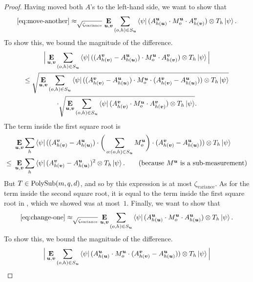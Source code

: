 \begin{proof}
Having moved both $A$'s to the left-hand side, we want to show that
\begin{equation}\label{eq:change-one}
\eqref{eq:move-another}
\approx_{\sqrt{\zeta_{\mathrm{variance}}}}
\mathop{\bf E\/}_{\boldsymbol{u}, \boldsymbol{v}} \sum_{(o, h) \in S_{\boldsymbol{u}}} \bra{\psi} (A^{\boldsymbol{u}}_{h(\boldsymbol{u})} \cdot M^{\boldsymbol{u}}_o \cdot A^{\boldsymbol{v}}_{h(\boldsymbol{v})}) \otimes T_h  \ket{\psi}.
\end{equation} 
To show this, we bound the magnitude of the difference.
\begin{multline}\label{eq:change-one-cauchy-schwarz}
\Big|\mathop{\bf E\/}_{\boldsymbol{u}, \boldsymbol{v}} \sum_{(o, h) \in S_{\boldsymbol{u}}} \bra{\psi} ((A^{\boldsymbol{v}}_{h(\boldsymbol{v})} - A^{\boldsymbol{u}}_{h(\boldsymbol{u})}) \cdot M^{\boldsymbol{u}}_o \cdot A^{\boldsymbol{v}}_{h(\boldsymbol{v})}) \otimes T_h  \ket{\psi}\Big|\\
\leq
\sqrt{\mathop{\bf E\/}_{\boldsymbol{u}, \boldsymbol{v}} \sum_{(o, h) \in S_{\boldsymbol{u}}} \bra{\psi} ((A^{\boldsymbol{v}}_{h(\boldsymbol{v})} - A^{\boldsymbol{u}}_{h(\boldsymbol{u})}) \cdot M^{\boldsymbol{u}}_o \cdot (A^{\boldsymbol{v}}_{h(\boldsymbol{v})} - A^{\boldsymbol{u}}_{h(\boldsymbol{u})})) \otimes T_h  \ket{\psi}}\\
\cdot \sqrt{\mathop{\bf E\/}_{\boldsymbol{u}, \boldsymbol{v}} \sum_{(o, h) \in S_{\boldsymbol{u}}} \bra{\psi} (A^{\boldsymbol{v}}_{h(\boldsymbol{v})} \cdot M^{\boldsymbol{u}}_o \cdot A^{\boldsymbol{v}}_{h(\boldsymbol{v})}) \otimes T_h  \ket{\psi}}.
\end{multline}
The term inside the first square root is
\begin{align*}
&\E_{\bu, \bv} \sum_h \bra{\psi} ((A^{\bv}_{h(\bv)} - A^{\bu}_{h(\bu)}) \cdot \bigg( \sum_{o:(o, h) \in S_{\bu}}M^{\bu}_o\bigg) \cdot (A^{\bv}_{h(\bv)} - A^{\bu}_{h(\bu)})) \otimes T_h  \ket{\psi}\\
\leq~&\E_{\bu, \bv} \sum_h \bra{\psi} (A^{\bv}_{h(\bv)} - A^{\bu}_{h(\bu)})^2 \otimes T_h  \ket{\psi}. \tag{because~$M^{\bu}$ is a sub-measurement}
\end{align*}
But $T \in \mathrm{PolySub}(m, q, d)$, and so by  this expression is at most $\zeta_{\mathrm{variance}}$.
As for the term inside the second square root, it is equal to the term inside the first square root in , which we showed was at most~$1$.
Finally, we want to show that
\begin{equation}\label{eq:change-another}
\eqref{eq:change-one}
\approx_{\sqrt{\zeta_{\mathrm{variance}}}}
\mathop{\bf E\/}_{\boldsymbol{u}, \boldsymbol{v}} \sum_{(o, h) \in S_{\boldsymbol{u}}} \bra{\psi} (A^{\boldsymbol{u}}_{h(\boldsymbol{u})} \cdot M^{\boldsymbol{u}}_o \cdot A^{\boldsymbol{u}}_{h(\boldsymbol{u})}) \otimes T_h  \ket{\psi}.
\end{equation} 
To show this, we bound the magnitude of the difference.
\begin{multline*}
\Big|
\E_{\bu, \bv} \sum_{(o, h) \in S_{\bu}} \bra{\psi} (A^{\bu}_{h(\bu)} \cdot M^{\bu}_o \cdot (A^{\bv}_{h(\bv)} - A^{\bu}_{h(\bu)})) \otimes T_h  \ket{\psi}\Big|\\

\end{multline*}
\end{proof}
